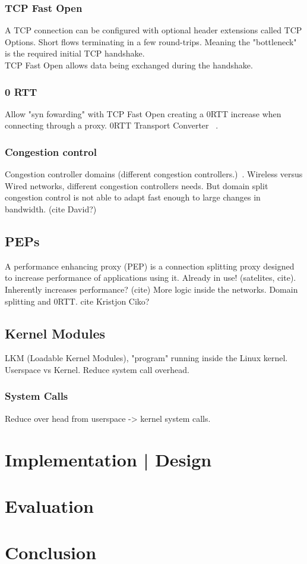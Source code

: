 \documentclass[a4paper,english, 11pt]{report}
\begin{document}
\subsection{TCP Fast Open}
A TCP connection can be configured with optional header extensions called TCP Options. 
Short flows terminating in a few round-trips. Meaning the "bottleneck" is the required initial TCP handshake.\\
TCP Fast Open allows data being exchanged during the handshake. 

\subsection{0 RTT}
Allow "syn fowarding" with TCP Fast Open creating a 0RTT increase when connecting through a proxy.
0RTT Transport Converter ~\cite{rfc8803}.

\subsection{Congestion control}
Congestion controller domains (different congestion controllers.)~\cite{rfc5783}.
Wireless versus Wired networks, different congestion controllers needs.
But domain split congestion control is not able to adapt fast enough to large changes in bandwidth. (cite David?)


\section{PEPs}
A performance enhancing proxy (PEP) is a connection splitting proxy designed to increase performance of applications using it. Already in use! (satelites, cite). Inherently increases performance? (cite)
More logic inside the networks. Domain splitting and 0RTT. {cite Kristjon Ciko?}

\section{Kernel Modules}
LKM (Loadable Kernel Modules), "program" running inside the Linux kernel.
Userspace vs Kernel. Reduce system call overhead.
\subsection{System Calls}
Reduce over head from userspace -> kernel system calls.

\chapter{Implementation | Design}
\chapter{Evaluation}
\chapter{Conclusion}

{}

\end{document}
